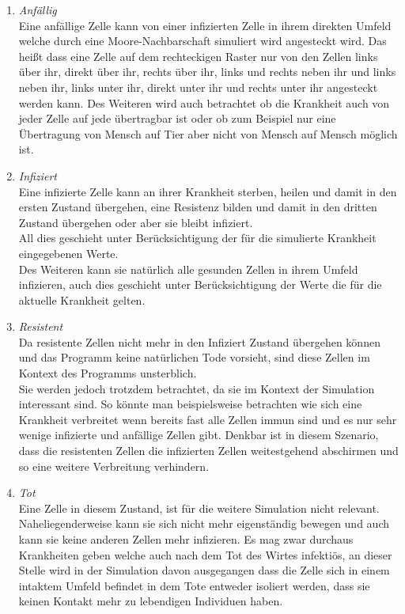 \begin{enumerate}
\item{\emph{Anfällig}\\
Eine anfällige Zelle kann von einer  infizierten Zelle in ihrem direkten Umfeld welche durch eine Moore-Nachbarschaft simuliert wird angesteckt wird. Das heißt dass eine Zelle auf dem rechteckigen Raster nur von den Zellen links über ihr, direkt über ihr, rechts über ihr, links und rechts neben ihr und links neben ihr, links unter ihr, direkt unter ihr und rechts unter ihr angesteckt werden kann. Des Weiteren wird auch betrachtet ob die Krankheit auch von jeder Zelle auf jede übertragbar ist oder ob zum Beispiel nur eine Übertragung von Mensch auf Tier aber nicht von Mensch auf Mensch möglich ist.
}
\item{\emph{Infiziert}\\
Eine infizierte Zelle kann an ihrer Krankheit sterben, heilen und damit in den ersten Zustand übergehen, eine Resistenz bilden und damit in den dritten Zustand übergehen oder aber sie bleibt infiziert.\\
All dies geschieht unter Berücksichtigung der für die simulierte Krankheit eingegebenen Werte.\\
Des Weiteren kann sie natürlich alle gesunden Zellen in ihrem Umfeld infizieren, auch dies geschieht unter Berücksichtigung der Werte die für die aktuelle Krankheit gelten.
}
\item{\emph{Resistent}\\
Da resistente Zellen nicht mehr in den Infiziert Zustand übergehen können und das Programm keine natürlichen Tode vorsieht, sind diese Zellen im Kontext des Programms unsterblich.\\
Sie werden jedoch trotzdem betrachtet, da sie im Kontext der Simulation interessant sind. So könnte man beispielsweise betrachten wie sich eine Krankheit verbreitet wenn bereits fast alle Zellen immun sind und es nur sehr wenige infizierte und anfällige Zellen gibt. Denkbar ist in diesem Szenario, dass die resistenten Zellen die infizierten Zellen weitestgehend abschirmen und so eine weitere Verbreitung verhindern. 
}

\item{\emph{Tot}\\
Eine Zelle in diesem Zustand, ist für die weitere Simulation nicht relevant. Naheliegenderweise kann sie sich nicht mehr eigenständig bewegen und auch kann sie keine anderen Zellen mehr infizieren. Es mag zwar durchaus Krankheiten geben welche auch nach dem Tot des Wirtes infektiös, an dieser Stelle wird in der Simulation davon ausgegangen dass die Zelle sich in einem intaktem Umfeld befindet in dem Tote entweder isoliert werden, dass sie keinen Kontakt mehr zu lebendigen Individuen haben. 
}
\end{enumerate}


